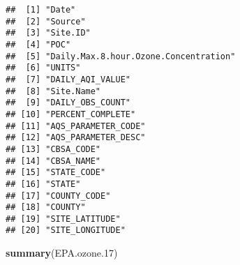 \documentclass[]{article}
\newenvironment{Shaded}{\begin{snugshade}}{\end{snugshade}}
\newcommand{\KeywordTok}[1]{\textcolor[rgb]{0.13,0.29,0.53}{\textbf{#1}}}
\newcommand{\DecValTok}[1]{\textcolor[rgb]{0.00,0.00,0.81}{#1}}
\newcommand{\NormalTok}[1]{#1}
\begin{document}
\begin{verbatim}
##  [1] "Date"                                
##  [2] "Source"                              
##  [3] "Site.ID"                             
##  [4] "POC"                                 
##  [5] "Daily.Max.8.hour.Ozone.Concentration"
##  [6] "UNITS"                               
##  [7] "DAILY_AQI_VALUE"                     
##  [8] "Site.Name"                           
##  [9] "DAILY_OBS_COUNT"                     
## [10] "PERCENT_COMPLETE"                    
## [11] "AQS_PARAMETER_CODE"                  
## [12] "AQS_PARAMETER_DESC"                  
## [13] "CBSA_CODE"                           
## [14] "CBSA_NAME"                           
## [15] "STATE_CODE"                          
## [16] "STATE"                               
## [17] "COUNTY_CODE"                         
## [18] "COUNTY"                              
## [19] "SITE_LATITUDE"                       
## [20] "SITE_LONGITUDE"
\end{verbatim}

\begin{Shaded}
\begin{Highlighting}[]
\KeywordTok{summary}\NormalTok{(EPA.ozone.}\DecValTok{17}\NormalTok{)}
\end{Highlighting}
\end{Shaded}
\end{document}
